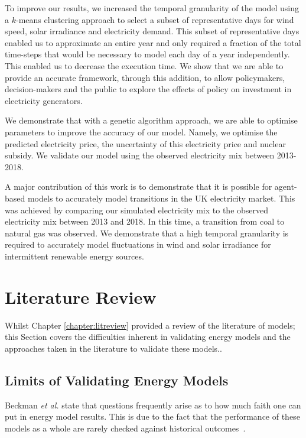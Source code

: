 To improve our results, we increased the temporal granularity of the model using a $k$-means clustering approach to select a subset of representative days for wind speed, solar irradiance and electricity demand. This subset of representative days enabled us to approximate an entire year and only required a fraction of the total time-steps that would be necessary to model each day of a year independently. This enabled us to decrease the execution time. We show that we are able to provide an accurate framework, through this addition, to allow policymakers, decision-makers and the public to explore the effects of policy on investment in electricity generators. 

We demonstrate that with a genetic algorithm approach, we are able to optimise parameters to improve the accuracy of our model. Namely, we optimise the predicted electricity price, the uncertainty of this electricity price and nuclear subsidy. We validate our model using the observed electricity mix between 2013-2018.

A major contribution of this work is to demonstrate that it is possible for agent-based models to accurately model transitions in the UK electricity market. This was achieved by comparing our simulated electricity mix to the observed electricity mix between 2013 and 2018. In this time, a transition from coal to natural gas was observed. We demonstrate that a high temporal granularity is required to accurately model fluctuations in wind and solar irradiance for intermittent renewable energy sources.


\clearpage
\section{Literature Review}
\label{elecsim:sec:litreview}

Whilst Chapter \ref{chapter:litreview} provided a review of the literature of models; this Section covers the difficulties inherent in validating energy models and the approaches taken in the literature to validate these models..

\subsection{Limits of Validating Energy Models}

Beckman \textit{et al.} state that questions frequently arise as to how much faith one can put in energy model results. This is due to the fact that the performance of these models as a whole are rarely checked against historical outcomes~\cite{Beckman2011}.


